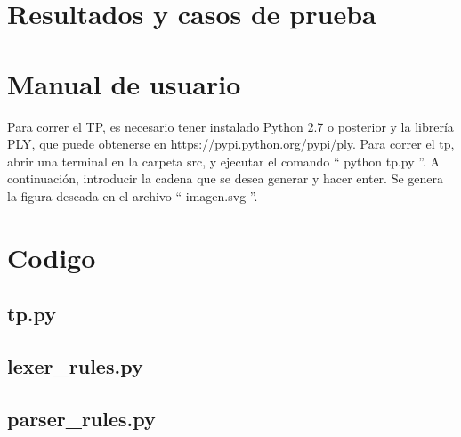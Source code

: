\documentclass[a4paper, 10pt, twoside]{article}
\begin{document}
\section{Resultados y casos de prueba}


\section{Manual de usuario}
Para correr el TP, es necesario tener instalado Python 2.7 o posterior y la librería PLY, que puede obtenerse en https://pypi.python.org/pypi/ply. Para correr el tp, abrir una terminal en la carpeta src, y ejecutar el comando `` python tp.py ''. A continuación, introducir la cadena que se desea generar y hacer enter. Se genera la figura deseada en el archivo `` imagen.svg ''.


\section{Codigo}


\subsection{tp.py}


\subsection{lexer_rules.py}


\subsection{parser_rules.py}

\end{document}
